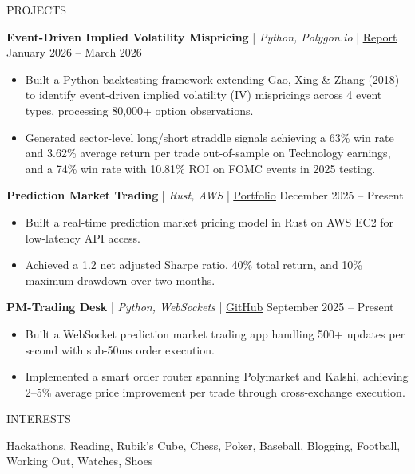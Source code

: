 \documentclass[]{mcdowellcv}
\begin{document}
\vspace{-2.5mm}
\begin{cvsection}{PROJECTS}
	\begin{cvsubsection}{}{}{}
		\textbf{Event-Driven Implied Volatility Mispricing} | \textit{Python, Polygon.io} | \underline{\href{https://ashwiniyer.com/projects/NUSA\%20Spring\%2026\%20RS\%20-\%20Equity\%20Vol.\%20Project.pdf}{Report}} \hfill{January 2026 -- March 2026}
		\begin{itemize}
			\item Built a Python backtesting framework extending Gao, Xing \& Zhang (2018) to identify event-driven implied volatility (IV) mispricings across 4 event types, processing 80,000+ option observations.
			\item Generated sector-level long/short straddle signals achieving a 63\% win rate and 3.62\% average return per trade out-of-sample on Technology earnings, and a 74\% win rate with 10.81\% ROI on FOMC events in 2025 testing.
		\end{itemize}
		\vspace{1.5mm}
		\textbf{Prediction Market Trading} | \textit{Rust, AWS} | \underline{\href{https://kalshi.com/ideas/profiles/whao}{Portfolio}} \hfill{December 2025 -- Present}
		\begin{itemize}
			\item Built a real-time prediction market pricing model in Rust on AWS EC2 for low-latency API access.
			\item Achieved a 1.2 net adjusted Sharpe ratio, 40\% total return, and 10\% maximum drawdown over two months.
		\end{itemize}
		\vspace{1.5mm}
		\textbf{PM-Trading Desk} | \textit{Python, WebSockets} | \underline{\href{https://github.com/Ashwin-Iyer1/pm-tradingdesk}{GitHub}} \hfill{September 2025 -- Present}
		\begin{itemize}
			\item Built a WebSocket prediction market trading app handling 500+ updates per second with sub-50ms order execution.
			\item Implemented a smart order router spanning Polymarket and Kalshi, achieving 2--5\% average price improvement per trade through cross-exchange execution.
		\end{itemize}
	\end{cvsubsection}
\end{cvsection}
\vspace{-2.5mm}
\begin{cvsection}{INTERESTS}
	\begin{cvsubsection}{}{}{}
		Hackathons, Reading, Rubik's Cube, Chess, Poker, Baseball, Blogging, Football, Working Out, Watches, Shoes
	\end{cvsubsection}
\end{cvsection}
\end{document}
